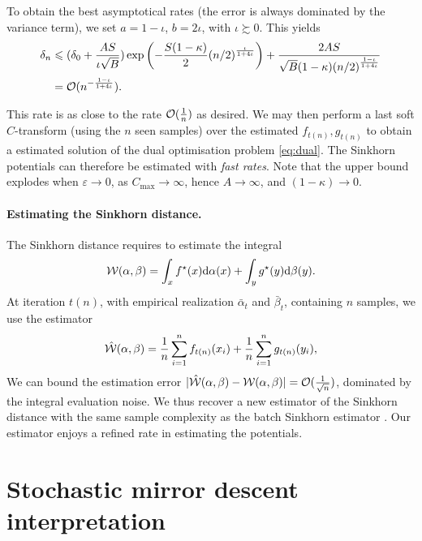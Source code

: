 To obtain the best asymptotical rates (the error is always dominated by the variance term), we set $a = 1 - \iota$, $ b = 2 \iota$, with $\iota \succsim 0$. This yields
\begin{align}
    \delta_n &\leqslant 
    (\delta_0 + \frac{A S}{\iota \sqrt{B}})
    \exp\left(- \frac{S(1 - \kappa)}{2} {(n/2)}^{\frac{\iota}{1 + 4\iota}}\right)
    + \frac{2 A S}{\sqrt{B}(1 - \kappa) {(n/2)}^{\frac{1 - \iota}{1 + 4\iota}}} \\
    &= \mathcal{O}(n^{-\frac{1 - \iota}{1 + 4 \iota}}).
\end{align}

This rate is as close to the rate $\mathcal{O}(\frac{1}{n})$ as desired. We may then
perform a last soft $C$-transform (using the $n$ seen samples) over the
estimated $f_{t(n)}, g_{t(n)}$ to obtain a estimated solution of the dual
optimisation problem \eqref{eq:dual}. The Sinkhorn potentials can therefore be
estimated with \textit{fast rates}. Note that the upper bound explodes when $\varepsilon
\to 0$, as $C_{\max} \to \infty$, hence $A \to \infty$, and $(1 - \kappa) \to 0$.

\paragraph{Estimating the Sinkhorn distance.} The Sinkhorn distance requires to estimate the integral
\begin{equation}
    \mathcal{W}(\alpha, \beta) = \int_x f^\star(x) \textrm{d} \alpha(x) + \int_y g^\star(y) \textrm{d} \beta(y).
\end{equation}
At iteration $t(n)$, with empirical realization $\bar \alpha_t$ and $\bar
\beta_t$, containing $n$ samples, we use the estimator
\begin{equation}
    \hat {\mathcal{W}}(\alpha, \beta) = \frac{1}{n} \sum_{i=1}^n f_{t(n)}(x_i) + \frac{1}{n} \sum_{i=1}^n g_{t(n)}(y_i),
\end{equation}
We can bound the estimation error $|\hat {\mathcal{W}}(\alpha, \beta) - \mathcal{W}(\alpha, \beta) | =
\mathcal{O}(\frac{1}{\sqrt{n}})$, dominated by the integral evaluation noise. We thus recover
a new estimator of the Sinkhorn distance with the same sample complexity as the
batch Sinkhorn estimator \citep{2019-Genevay-aistats}. Our estimator enjoys a
refined rate in estimating the potentials.

\section{Stochastic mirror descent interpretation}
\label{sec-mirror}

